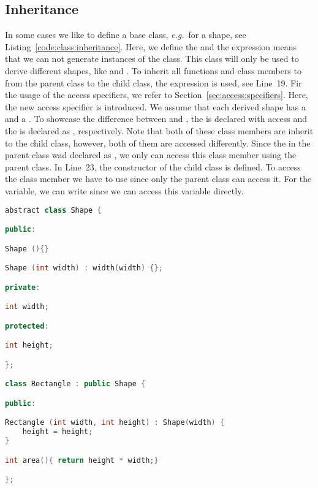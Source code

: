 \subsection{Inheritance}
In some cases we like to define a base class, \emph{e.g.}\ for a shape, see Listing~\ref{code:class:inheritance}. Here, we define the  and the expression  means that we can not generate instances of the class. This class will only be used to derive different shapes, like  and . To inherit all functions and class members to from the parent class to the child class, the expression  is used, see Line~19. Fir the usage of the access specifiers, we refer to Section~\ref{sec:access:specifiers}. Here, the new access specifier  is introduced. We assume that each derived shape has a  and a . To showcase the difference between  and , the  is declared with  access and the  is declared as , respectively. Note that both of these class members are inherit to the child class, however, both of them are accessed differently. Since the  in the parent class wad declared as , we only can access this class member using the parent class. In Line~23, the constructor of the child class  is defined. To access the  class member we have to use  since only the parent class can access it. For the  variable, we can write  since we can access this variable directly.

\begin{lstlisting}[language=c++,caption={Example for inheritance of classes.\label{code:class:inheritance}},float,floatplacement=tb]
abstract class Shape {

public:

Shape (){}

Shape (int width) : width(width) {};

private:

int width;

protected:

int height;

};

class Rectangle : public Shape {

public:

Rectangle (int width, int height) : Shape(width) {
	height = height;
}

int area(){ return height * width;}

};

\end{lstlisting}


